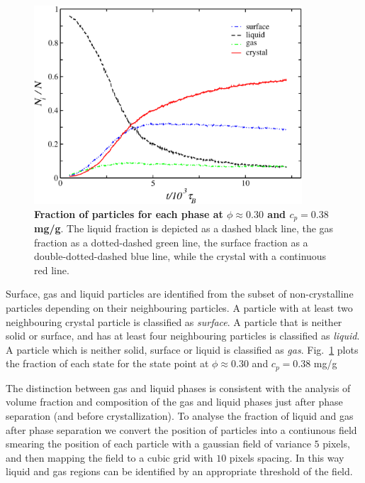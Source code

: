 \begin{figure}[!t]
 \centering
 \includegraphics[width=10cm]{./fractions.pdf}
 \caption{{\bf Fraction of particles for each phase at $\phi\approx 0.30$ and $c_p=0.38$ mg/g}. The liquid
 fraction is depicted as a dashed black line, the gas fraction as a dotted-dashed green line, the surface
 fraction as a double-dotted-dashed blue line, while the crystal with a continuous red line.}
 \label{fig:fractions}
\end{figure}

Surface, gas and liquid particles are identified from the subset of non-crystalline particles depending
on their neighbouring particles. A particle with at least two neighbouring crystal particle is classified as
\emph{surface}. A particle that is neither solid or surface, and has at least four neighbouring particles
is classified as \emph{liquid}. A particle which is neither solid, surface or liquid is classified as \emph{gas}.
Fig.~\ref{fig:fractions} plots the fraction of each state for the state point at $\phi\approx 0.30$ and $c_p=0.38$ mg/g

The distinction between gas and liquid phases is consistent with the analysis of volume fraction and composition
of the gas and liquid phases just after phase separation (and before crystallization). To analyse the fraction
of liquid and gas after phase separation we convert the position of particles into a contiunous field smearing
the position of each particle with a gaussian field of variance $5$ pixels, and then mapping the field
to a cubic grid with $10$ pixels spacing. In this way liquid and gas regions can be identified by
an appropriate threshold of the field.


